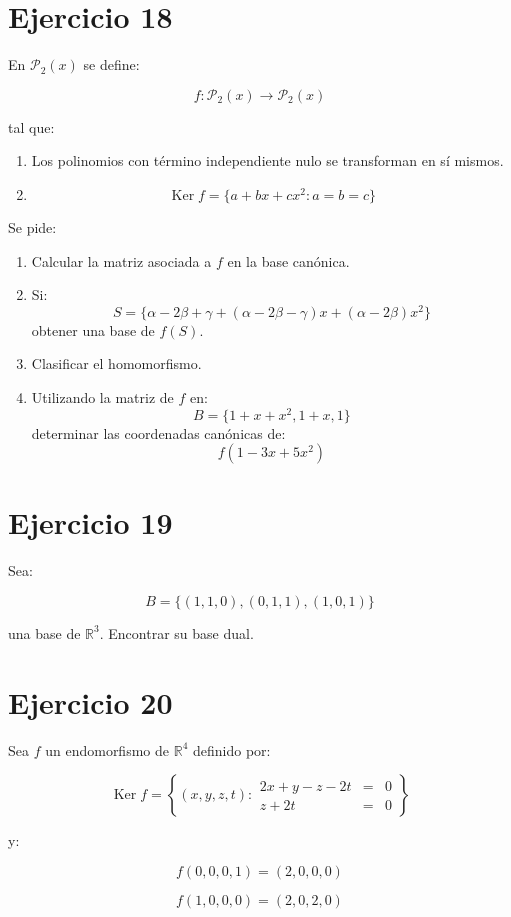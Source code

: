 \documentclass[11pt,a4paper]{article}
\newcommand{\R}{\mathbb{R}}
\newcommand{\Ker}{\operatorname{Ker}}
\begin{document}
\section{Ejercicio 18}
En $\mathcal{P}_2(x)$ se define:

\[
f:\mathcal{P}_2(x)\longrightarrow\mathcal{P}_2(x)
\]

tal que:

\begin{enumerate}[label=\arabic*)]
	\item Los polinomios con término independiente nulo se transforman en sí mismos.
	\item
	\[
	\Ker f=
	\{a+bx+cx^2:a=b=c\}
	\]
\end{enumerate}

Se pide:

\begin{enumerate}[label=\alph*)]
	\item Calcular la matriz asociada a $f$ en la base canónica.
	\item Si:
	\[
	S=
	\{
	\alpha-2\beta+\gamma
	+
	(\alpha-2\beta-\gamma)x
	+
	(\alpha-2\beta)x^2
	\}
	\]
	obtener una base de $f(S)$.
	\item Clasificar el homomorfismo.
	\item Utilizando la matriz de $f$ en:
	\[
	B=\{1+x+x^2,1+x,1\}
	\]
	determinar las coordenadas canónicas de:
	\[
	f(1-3x+5x^2)
	\]
\end{enumerate}

\section{Ejercicio 19}
Sea:

\[
B=
\{(1,1,0),(0,1,1),(1,0,1)\}
\]

una base de $\R^3$. Encontrar su base dual.

\section{Ejercicio 20}
Sea $f$ un endomorfismo de $\R^4$ definido por:

\[
\Ker f=
\left\{
(x,y,z,t):
\begin{array}{rcl}
2x+y-z-2t&=&0\\
z+2t&=&0
\end{array}
\right\}
\]

y:

\[
f(0,0,0,1)=(2,0,0,0)
\]

\[
f(1,0,0,0)=(2,0,2,0)
\]
\end{document}
